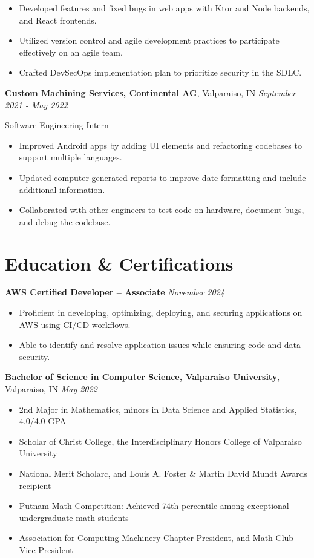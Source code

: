 \documentclass{article}
\begin{document}
\begin{itemize}
    \item Developed features and fixed bugs in web apps with Ktor and Node backends, and React frontends.
    \item Utilized version control and agile development practices to participate effectively on an agile team.
    \item Crafted DevSecOps implementation plan to prioritize security in the SDLC.
\end{itemize}

\textbf{Custom Machining Services, Continental AG}, Valparaiso, IN \textit{September 2021 - May 2022}

Software Engineering Intern

\begin{itemize}
    \item Improved Android apps by adding UI elements and refactoring codebases to support multiple languages.
    \item Updated computer-generated reports to improve date formatting and include additional information.
    \item Collaborated with other engineers to test code on hardware, document bugs, and debug the codebase.
\end{itemize}

\section{Education \& Certifications}

\textbf{AWS Certified Developer – Associate} \textit{November 2024}
\begin{itemize}
    \item Proficient in developing, optimizing, deploying, and securing applications on AWS using CI/CD workflows.
    \item Able to identify and resolve application issues while ensuring code and data security.
\end{itemize}

\textbf{Bachelor of Science in Computer Science, Valparaiso University}, Valparaiso, IN \textit{May 2022}
\begin{itemize}
    \item 2nd Major in Mathematics, minors in Data Science and Applied Statistics, 4.0/4.0 GPA
    \item Scholar of Christ College, the Interdisciplinary Honors College of Valparaiso University
    \item National Merit Scholarc, and Louis A. Foster \& Martin David Mundt Awards recipient
    \item Putnam Math Competition: Achieved 74th percentile among exceptional undergraduate math students
    \item Association for Computing Machinery Chapter President, and Math Club Vice President
\end{itemize}
\end{document}
